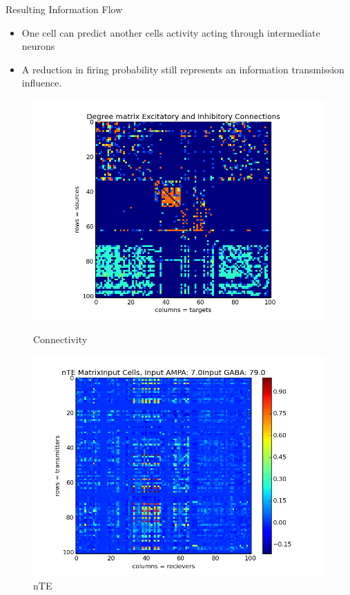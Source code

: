 \documentclass{beamer}
\begin{document}
\begin{frame}{Resulting Information Flow}
\begin{itemize}

\vfill \item One cell can predict another cells activity acting through intermediate neurons%
\vfill \item A reduction in firing probability still represents an information transmission influence.
\end{itemize}
\begin{figure}
\begin{minipage}{0.45\linewidth}
\centering
\includegraphics[scale=0.301]{Both_transmitters_degree_matrix0_0500_012501_00_01009_010_0.png}

\vfill Connectivity


\end{minipage}
\begin{minipage}{0.45\linewidth}
\centering


\includegraphics[scale=0.301]{nTE_matrix_imshow0_0500_0125010_010012_010_0.png}
\vfill nTE


\end{minipage}
\end{figure}
\end{frame}
\end{document}

